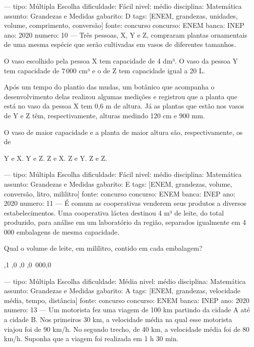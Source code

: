 ---
tipo: Múltipla Escolha
dificuldade: Fácil
nivel: médio
disciplina: Matemática
assunto: Grandezas e Medidas
gabarito: D
tags: [ENEM, grandezas, unidades, volume, comprimento, conversão]
fonte: concurso
concurso: ENEM
banca: INEP
ano: 2020
numero: 10
---
\question
Três pessoas, X, Y e Z, compraram plantas ornamentais de uma mesma espécie que serão cultivadas em vasos de diferentes tamanhos.

O vaso escolhido pela pessoa X tem capacidade de 4 dm³. O vaso da pessoa Y tem capacidade de 7\,000 cm³ e o de Z tem capacidade igual a 20 L.

Após um tempo do plantio das mudas, um botânico que acompanha o desenvolvimento delas realizou algumas medições e registrou que a planta que está no vaso da pessoa X tem 0,6 m de altura. Já as plantas que estão nos vasos de Y e Z têm, respectivamente, alturas medindo 120 cm e 900 mm.

O vaso de maior capacidade e a planta de maior altura são, respectivamente, os de
\begin{choices}
\choice Y e X.
\choice Y e Z.
\choice Z e X.
\CorrectChoice Z e Y.
\choice Z e Z.
\end{choices}

---
tipo: Múltipla Escolha
dificuldade: Fácil
nivel: médio
disciplina: Matemática
assunto: Grandezas e Medidas
gabarito: E
tags: [ENEM, grandezas, volume, conversão, litro, mililitro]
fonte: concurso
concurso: ENEM
banca: INEP
ano: 2020
numero: 11
---
\question
É comum as cooperativas venderem seus produtos a diversos estabelecimentos. Uma cooperativa láctea destinou 4 m³ de leite, do total produzido, para análise em um laboratório da região, separados igualmente em 4\,000 embalagens de mesma capacidade.

Qual o volume de leite, em mililitro, contido em cada embalagem?
\begin{choices}
,1
,0
,0
,0
\,000,0
\end{choices}

---
tipo: Múltipla Escolha
dificuldade: Média
nivel: médio
disciplina: Matemática
assunto: Grandezas e Medidas
gabarito: A
tags: [ENEM, grandezas, velocidade média, tempo, distância]
fonte: concurso
concurso: ENEM
banca: INEP
ano: 2020
numero: 13
---
\question
Um motorista fez uma viagem de 100 km partindo da cidade A até a cidade B. Nos primeiros 30 km, a velocidade média na qual esse motorista viajou foi de 90 km/h. No segundo trecho, de 40 km, a velocidade média foi de 80 km/h. Suponha que a viagem foi realizada em 1 h 30 min.

